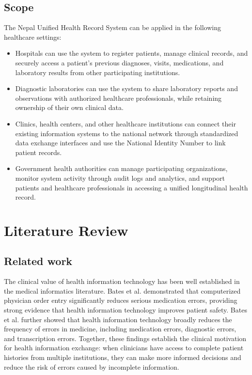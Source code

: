 \documentclass[12pt]{report}
\numberwithin{equation}{chapter}
\begin{document}
\section{Scope}
The Nepal Unified Health Record System can be applied in the following healthcare settings:
\begin{itemize}
    \item Hospitals can use the system to register patients, manage clinical records, and securely access a patient's previous diagnoses, visits, medications, and laboratory results from other participating institutions.
    \item Diagnostic laboratories can use the system to share laboratory reports and observations with authorized healthcare professionals, while retaining ownership of their own clinical data.
    \item Clinics, health centers, and other healthcare institutions can connect their existing information systems to the national network through standardized data exchange interfaces and use the National Identity Number to link patient records.
    \item Government health authorities can manage participating organizations, monitor system activity through audit logs and analytics, and support patients and healthcare professionals in accessing a unified longitudinal health record.
\end{itemize}

\chapter{Literature Review}
\section{Related work}

The clinical value of health information technology has been well established in the medical informatics literature. Bates et al. \cite{bates2} demonstrated that computerized physician order entry significantly reduces serious medication errors, providing strong evidence that health information technology improves patient safety. Bates et al. \cite{bates1} further showed that health information technology broadly reduces the frequency of errors in medicine, including medication errors, diagnostic errors, and transcription errors. Together, these findings establish the clinical motivation for health information exchange: when clinicians have access to complete patient histories from multiple institutions, they can make more informed decisions and reduce the risk of errors caused by incomplete information.
\end{document}
